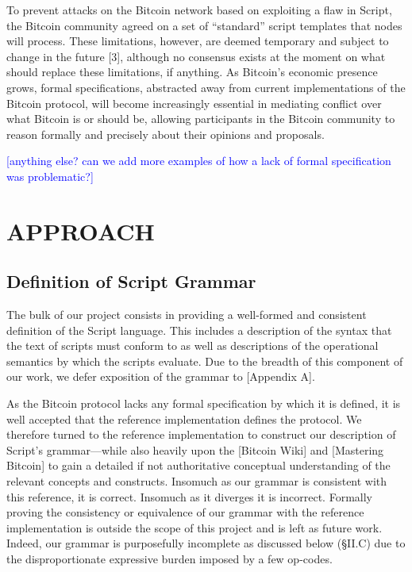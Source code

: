 \documentclass[letterpaper, 10 pt, conference]{ieeeconf}
\begin{document}
To prevent attacks on the Bitcoin network based on exploiting a flaw in Script, the Bitcoin community agreed on a set of ``standard'' script templates that nodes will process. These limitations, however, are deemed temporary and subject to change in the future [3], although no consensus exists at the moment on what should replace these limitations, if anything. As Bitcoin's economic presence grows, formal specifications, abstracted away from current implementations of the Bitcoin protocol, will become increasingly essential in mediating conflict over what Bitcoin is or should be, allowing participants in the Bitcoin community to reason formally and precisely about their opinions and proposals.

\textcolor{blue}{[anything else? can we add more examples of how a lack of formal specification was problematic?]}


\section{APPROACH}

\subsection{Definition of Script Grammar}
The bulk of our project consists in providing a well-formed and consistent definition of the Script language. This includes a description of the syntax that the text of scripts must conform to as well as descriptions of the operational semantics by which the scripts evaluate. Due to the breadth of this component of our work, we defer exposition of the grammar to [Appendix A].

As the Bitcoin protocol lacks any formal specification by which it is defined, it is well accepted that the reference implementation defines the protocol. We therefore turned to the reference implementation to construct our description of Script's grammar---while also heavily upon the [Bitcoin Wiki] and [Mastering Bitcoin] to gain a detailed if not authoritative conceptual understanding of the relevant concepts and constructs. Insomuch as our grammar is consistent with this reference, it is correct. Insomuch as it diverges it is incorrect. Formally proving the consistency or equivalence of our grammar with the reference implementation is outside the scope of this project and is left as future work. Indeed, our grammar is purposefully incomplete as discussed below (\S II.C) due to the disproportionate expressive burden imposed by a few op-codes.
\end{document}
